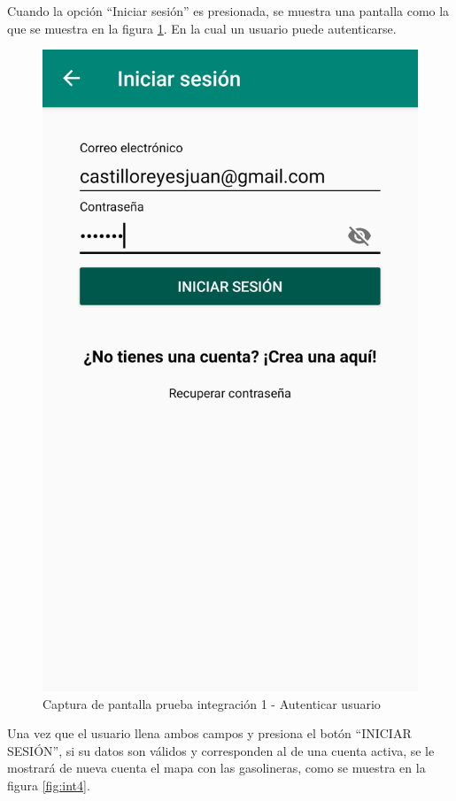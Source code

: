 Cuando la opción ``Iniciar sesión'' es presionada, se muestra una pantalla como la que se muestra en la figura \ref{fig:int3}. En la cual un usuario puede autenticarse.

\begin{figure}[H]
	\centering
	\includegraphics[scale=.2]{DocumentoTecnico/Capitulo6/integracion/Software/images/3.png}
	\caption{Captura de pantalla prueba integración 1 - Autenticar usuario}
	\label{fig:int3}
\end{figure}

Una vez que el usuario llena ambos campos y presiona el botón ``INICIAR SESIÓN'', si su datos son válidos y corresponden al de una cuenta activa, se le mostrará de nueva cuenta el mapa con las gasolineras, como se muestra en la figura \ref{fig:int4}.


